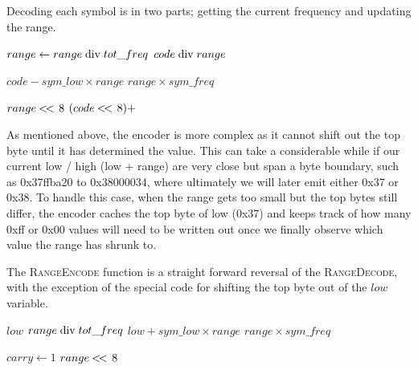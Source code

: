 \documentclass[a4paper]{article}
\begin{document}
Decoding each symbol is in two parts; getting the current frequency and updating the range.

\begin{algorithmic}[1]
  \State $range \gets range \bdiv tot\_freq$
  \State \Return $code \bdiv range$
\EndFunction
\end{algorithmic}

\begin{algorithmic}[1]
  \settowidth{\maxwidth}{range\ }
  \State {} $code - sym\_low \times range$
  \State {} $range \times sym\_freq$

   
    \settowidth{\maxwidth}{range\ }
    \State {} $range \mathbin{<\mkern-3mu<\,} 8$
    \State {} $(code\mathbin{<\mkern-3mu<\,}8) + $
  \EndWhile
\EndProcedure
\end{algorithmic}

As mentioned above, the encoder is more complex as it cannot shift out the top byte until it has determined the value.
This can take a considerable while if our current low / high (low + range) are very close but span a byte boundary, such as 0x37ffba20 to 0x38000034, where ultimately we will later emit either 0x37 or 0x38.
To handle this case, when the range gets too small but the top bytes still differ, the encoder caches the top byte of low (0x37) and keeps track of how many 0xff or 0x00 values will need to be written out once we finally observe which value the range has shrunk to.

The \textsc{RangeEncode} function is a straight forward reversal of the \textsc{RangeDecode}, with the exception of the special code for shifting the top byte out of the $low$ variable.

\begin{algorithmic}[1]
  \settowidth{\maxwidth}{old\_low\ }
  \State {} $low$
  \State {} $range \bdiv tot\_freq$
  \State {} $low + sym\_low \times range$
  \State {} $range \times sym\_freq$

  \Statex
    \State $carry \gets 1$ 
  \EndIf
   
    \settowidth{\maxwidth}{range\ }
    \State {} $range \mathbin{<\mkern-3mu<\,} 8$
    \State {}
  \EndWhile
\EndProcedure
\end{algorithmic}
\end{document}
